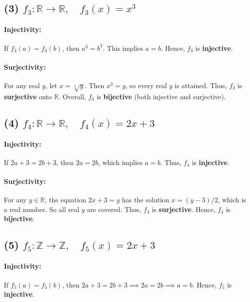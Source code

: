 \documentclass[12pt]{article}
\begin{document}
\bigskip

\subsection*{(3) $f_3 : \mathbb{R} \to \mathbb{R}, \quad f_3(x) = x^3$}
\paragraph{Injectivity:}
If $f_3(a) = f_3(b)$, then $a^3 = b^3$. This implies $a = b$. Hence, $f_3$ is \textbf{injective}.

\paragraph{Surjectivity:}
For any real $y$, let $x = \sqrt[3]{y}$. Then $x^3 = y$, so every real $y$ is attained. Thus, $f_3$ is \textbf{surjective} onto $\mathbb{R}$.  
Overall, $f_3$ is \textbf{bijective} (both injective and surjective).

\bigskip

\subsection*{(4) $f_4 : \mathbb{R} \to \mathbb{R}, \quad f_4(x) = 2x + 3$}
\paragraph{Injectivity:}
If $2a + 3 = 2b + 3$, then $2a = 2b$, which implies $a=b$. Thus, $f_4$ is \textbf{injective}.

\paragraph{Surjectivity:}
For any $y \in \mathbb{R}$, the equation $2x + 3 = y$ has the solution $x = (y-3)/2$, which is a real number. So all real $y$ are covered. Thus, $f_4$ is \textbf{surjective}.  
Hence, $f_4$ is \textbf{bijective}.

\bigskip

\subsection*{(5) $f_5 : \mathbb{Z} \to \mathbb{Z}, \quad f_5(x) = 2x + 3$}
\paragraph{Injectivity:}
If $f_5(a) = f_5(b)$, then $2a + 3 = 2b + 3 \implies 2a = 2b \implies a = b$. Hence, $f_5$ is \textbf{injective}.
\end{document}
